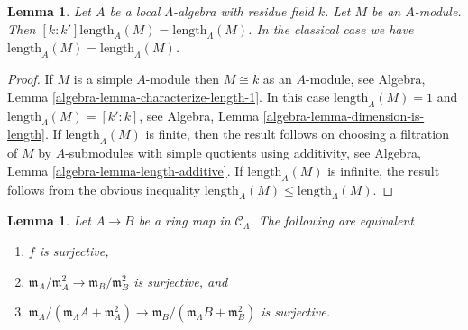 \documentclass{stacks-project}
\theoremstyle{plain}
\newtheorem{lemma}[subsection]{Lemma}
\theoremstyle{definition}
\theoremstyle{remark}
\numberwithin{equation}{subsection}
\begin{document}
\begin{lemma}
\label{lemma-length}
Let $A$ be a local $\Lambda$-algebra with residue field $k$.
Let $M$ be an $A$-module. Then
$[k : k'] \text{length}_A(M) = \text{length}_\Lambda(M)$.
In the classical case we have
$\text{length}_A(M) = \text{length}_\Lambda(M)$.
\end{lemma}

\begin{proof}
If $M$ is a simple $A$-module then $M \cong k$ as an $A$-module, see
Algebra, Lemma \ref{algebra-lemma-characterize-length-1}.
In this case $\text{length}_A(M) = 1$ and
$\text{length}_\Lambda(M) = [k' : k]$, see
Algebra, Lemma \ref{algebra-lemma-dimension-is-length}.
If $\text{length}_A(M)$ is finite, then the result follows on
choosing a filtration of $M$ by $A$-submodules with simple quotients
using additivity, see
Algebra, Lemma \ref{algebra-lemma-length-additive}.
If $\text{length}_A(M)$ is infinite, the result follows from the obvious
inequality $\text{length}_A(M) \leq \text{length}_\Lambda(M)$.
\end{proof}

\begin{lemma}
\label{lemma-surjective}
Let $A \to B$ be a ring map in $\mathcal{C}_\Lambda$.
The following are equivalent
\begin{enumerate}
\item $f$ is surjective,
\item $\mathfrak m_A/\mathfrak m_A^2 \to \mathfrak m_B/\mathfrak m_B^2$
is surjective, and
\item $\mathfrak m_A/(\mathfrak m_\Lambda A + \mathfrak m_A^2)
\to \mathfrak m_B/(\mathfrak m_\Lambda B + \mathfrak m_B^2)$ is surjective.
\end{enumerate}
\end{lemma}
\end{document}
